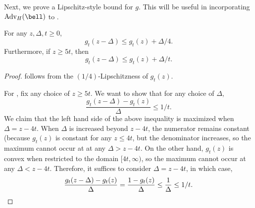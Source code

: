 \documentclass[11pt]{article}
\newcommand{\Adv}{\mathrm{Adv}}
\begin{document}
Next, we prove a Lipschitz-style bound for $g$. This will be useful in incorporating $\Adv_H(\bell)$ to .
\begin{proposition}
    \label{prop:lipschitz-bounds}
    For any $z, \Delta, t \geq 0$,
    \begin{equation}
        \label{eq:lipschitz}
        g_t(z - \Delta) \leq g_t(z) + \Delta/4.
    \end{equation}
    Furthermore, if $z \geq 5t$, then
    \begin{equation}
        \label{eq:lipschitz-scaled}
        g_t(z - \Delta) \leq g_t(z) + \Delta/t.
    \end{equation}
\end{proposition}
\begin{proof}
     follows from the $(1/4)$-Lipschitzness of $g_t(z)$.

    For , fix any choice of $z \geq 5t$. We want to show that for any choice of $\Delta$,
    \begin{equation*}
        \frac{ g_t(z - \Delta) - g_t(z)}{\Delta} \leq 1/t.
    \end{equation*}
    We claim that the left hand side of the above inequality is maximized when $\Delta = z - 4t$. When $\Delta$ is increased beyond $z - 4t$, the numerator remains constant (because $g_t(z)$ is constant for any $z \leq 4t$, but the denominator increases, so the maximum cannot occur at at any $\Delta > z-4t$. On the other hand, $g_t(z)$ is convex when restricted to the domain $[4t, \infty)$, so the maximum cannot occur at any $\Delta < z - 4t$. Therefore, it suffices to consider $\Delta = z - 4t$, in which case,
    \begin{equation*}
         \frac{ g_t(z - \Delta) - g_t(z)}{\Delta} = \frac{1 - g_t(z)}{\Delta} \leq \frac{1}{\Delta} \leq 1/t. \qedhere
    \end{equation*}
\end{proof}
\end{document}
